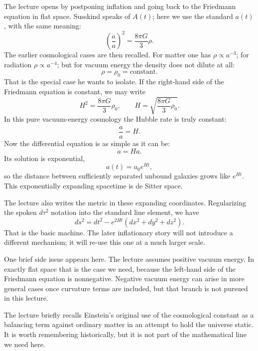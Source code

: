 The lecture opens by postponing inflation and going back to the Friedmann equation in flat space. Susskind speaks of \(A(t)\); here we use the standard \(a(t)\), with the same meaning:
\begin{equation}
\left(\frac{\dot a}{a}\right)^2=\frac{8\pi G}{3}\rho.
\end{equation}
The earlier cosmological cases are then recalled. For matter one has \(\rho\propto a^{-3}\); for radiation \(\rho\propto a^{-4}\); but for vacuum energy the density does not dilute at all:
\begin{equation}
\rho=\rho_0=\text{constant}.
\end{equation}
That is the special case he wants to isolate. If the right-hand side of the Friedmann equation is constant, we may write
\begin{equation}
H^2=\frac{8\pi G}{3}\rho_0,
\qquad
H=\sqrt{\frac{8\pi G}{3}\rho_0}.
\end{equation}
In this pure vacuum-energy cosmology the Hubble rate is truly constant:
\begin{equation}
\frac{\dot a}{a}=H.
\end{equation}
Now the differential equation is as simple as it can be:
\begin{equation}
\dot a = H a.
\end{equation}
Its solution is exponential,
\begin{equation}
a(t)=a_0 e^{Ht},
\end{equation}
so the distance between sufficiently separated unbound galaxies grows like \(e^{Ht}\). This exponentially expanding spacetime is de Sitter space.

The lecture also writes the metric in these expanding coordinates. Regularizing the spoken \(d\tau^2\) notation into the standard line element, we have
\begin{equation}
ds^2 = dt^2 - e^{2Ht}\left(dx^2+dy^2+dz^2\right).
\end{equation}
That is the basic machine. The later inflationary story will not introduce a different mechanism; it will re-use this one at a much larger scale.

One brief side issue appears here. The lecture assumes positive vacuum energy. In exactly flat space that is the case we need, because the left-hand side of the Friedmann equation is nonnegative. Negative vacuum energy can arise in more general cases once curvature terms are included, but that branch is not pursued in this lecture.

\begin{remark}
The lecture briefly recalls Einstein's original use of the cosmological constant as a balancing term against ordinary matter in an attempt to hold the universe static. It is worth remembering historically, but it is not part of the mathematical line we need here.
\end{remark}

